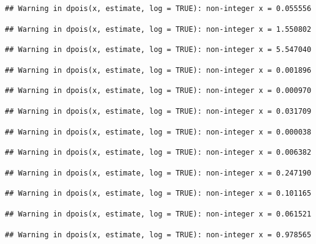 \documentclass[]{article}
\begin{document}
\begin{verbatim}
## Warning in dpois(x, estimate, log = TRUE): non-integer x = 0.055556
\end{verbatim}

\begin{verbatim}
## Warning in dpois(x, estimate, log = TRUE): non-integer x = 1.550802
\end{verbatim}

\begin{verbatim}
## Warning in dpois(x, estimate, log = TRUE): non-integer x = 5.547040
\end{verbatim}

\begin{verbatim}
## Warning in dpois(x, estimate, log = TRUE): non-integer x = 0.001896
\end{verbatim}

\begin{verbatim}
## Warning in dpois(x, estimate, log = TRUE): non-integer x = 0.000970
\end{verbatim}

\begin{verbatim}
## Warning in dpois(x, estimate, log = TRUE): non-integer x = 0.031709
\end{verbatim}

\begin{verbatim}
## Warning in dpois(x, estimate, log = TRUE): non-integer x = 0.000038
\end{verbatim}

\begin{verbatim}
## Warning in dpois(x, estimate, log = TRUE): non-integer x = 0.006382
\end{verbatim}

\begin{verbatim}
## Warning in dpois(x, estimate, log = TRUE): non-integer x = 0.247190
\end{verbatim}

\begin{verbatim}
## Warning in dpois(x, estimate, log = TRUE): non-integer x = 0.101165
\end{verbatim}

\begin{verbatim}
## Warning in dpois(x, estimate, log = TRUE): non-integer x = 0.061521
\end{verbatim}

\begin{verbatim}
## Warning in dpois(x, estimate, log = TRUE): non-integer x = 0.978565
\end{verbatim}
\end{document}
